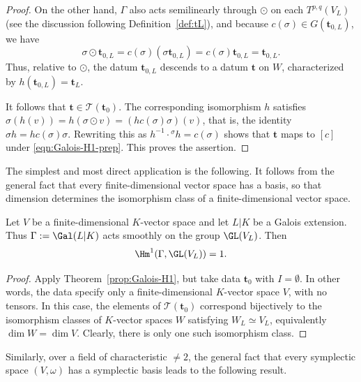 \begin{proof}
	On the other hand, $\Gamma$ also acts semilinearly through $\odot$ on each
	$T^{p,q}(V_L)$ (see the discussion following
	Definition~\ref{def:tL}), and because
	$c(\sigma)\in G(\mathbf{t}_{0,L})$, we have
	\[
	\sigma\odot\mathbf{t}_{0,L}
	=c(\sigma)(\sigma\mathbf{t}_{0,L})
	=c(\sigma)\mathbf{t}_{0,L}
	=\mathbf{t}_{0,L}.
	\]
	Thus, relative to $\odot$, the datum $\mathbf{t}_{0,L}$ descends to a datum
	$\mathbf{t}$ on $W$, characterized by
	$h(\mathbf{t}_{0,L})=\mathbf{t}_L$.

	It follows that $\mathbf{t}\in\mathcal{T}(\mathbf{t}_0)$. The corresponding
	isomorphism $h$ satisfies
	$\sigma(h(v))=h(\sigma\odot v)=(hc(\sigma)\sigma)(v)$, that is, the identity
	$\sigma h=hc(\sigma)\sigma$. Rewriting this as
	$h^{-1}\cdot{}^\sigma h=c(\sigma)$ shows that $\mathbf{t}$ maps to $[c]$
	under \eqref{eqn:Galois-H1-prep}. This proves the assertion.
\end{proof}

The simplest and most direct application is the following. It follows from
the general fact that every finite-dimensional vector space has a basis, so
that dimension determines the isomorphism class of a finite-dimensional
vector space.

\begin{theorem}\label{prop:Hilbert-90-GL}
	Let $V$ be a finite-dimensional $K$-vector space and let $L|K$ be a Galois
	extension. Thus $\Gamma:=\Gal(L|K)$ acts smoothly on the group $\GL(V_L)$.
	Then
	\[
	\Hm^1(\Gamma,\GL(V_L))=1.
	\]
\end{theorem}
\begin{proof}
	Apply Theorem~\ref{prop:Galois-H1}, but take data $\mathbf{t}_0$ with
	$I=\emptyset$. In other words, the data specify only a finite-dimensional
	$K$-vector space $V$, with no tensors. In this case, the elements of
	$\mathscr{T}(\mathbf{t}_0)$ correspond bijectively to the isomorphism
	classes of $K$-vector spaces $W$ satisfying $W_L\simeq V_L$, equivalently
	$\dim W=\dim V$. Clearly, there is only one such isomorphism class.
\end{proof}

Similarly, over a field of characteristic $\neq2$, the general fact that
every symplectic space $(V,\omega)$ has a symplectic basis leads to the
following result.

